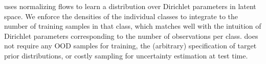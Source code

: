 \PostNetacro uses normalizing flows to learn a distribution over Dirichlet parameters in latent space. We enforce the densities of the individual classes to integrate to the number of training samples in that class, which matches well with the intuition of Dirichlet parameters corresponding to the number of observations per class. \PostNetacro does not require any OOD samples for training, the (arbitrary) specification of target prior distributions, or costly sampling for uncertainty estimation at test time.
